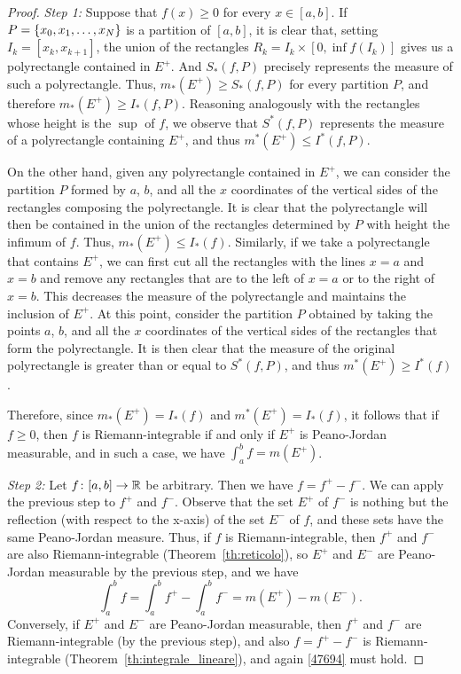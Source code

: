 \begin{proof}
\emph{Step 1:} Suppose that $f(x)\ge 0$ for every $x\in [a,b]$. If $P={\left\{ x_0,x_1, \dots, x_N \right\}}$ is a partition of $[a,b]$, it is clear that, setting $I_k = [x_k,x_{k+1}]$, the union of the rectangles $R_k = I_k \times [0,\inf f(I_k)]$ gives us a polyrectangle contained in $E^+$. And $S_*(f,P)$ precisely represents the measure of such a polyrectangle. Thus, $m_*(E^+)\ge S_*(f,P)$ for every partition $P$, and therefore $m_*(E^+)\ge I_*(f,P)$. Reasoning analogously with the rectangles whose height is the $\sup$ of $f$, we observe that $S^*(f,P)$ represents the measure of a polyrectangle containing $E^+$, and thus $m^*(E^+)\le I^*(f,P)$.

On the other hand, given any polyrectangle contained in $E^+$, we can consider
the partition $P$ formed by $a$, $b$, and all the $x$ coordinates of the
vertical sides of the rectangles composing the polyrectangle. It is clear that
the polyrectangle will then be contained in the union of the rectangles
determined by $P$ with height the infimum of $f$. Thus, $m_*(E^+)\le I_*(f)$.
Similarly, if we take a polyrectangle that contains $E^+$, we can first cut all
the rectangles with the lines $x=a$ and $x=b$ and remove any rectangles that are
to the left of $x=a$ or to the right of $x=b$. This decreases the measure of the
polyrectangle and maintains the inclusion of $E^+$. At this point, consider the
partition $P$ obtained by taking the points $a$, $b$, and all the $x$
coordinates of the vertical sides of the rectangles that form the polyrectangle.
It is then clear that the measure of the original polyrectangle is greater than
or equal to $S^*(f,P)$, and thus $m^*(E^+)\ge I^*(f)$.

Therefore, since $m_*(E^+)=I_*(f)$ and $m^*(E^+)=I_*(f)$, it follows that if
$f\ge0$, then $f$ is Riemann-integrable if and only if $E^+$ is Peano-Jordan
measurable, and in such a case, we have $\int_a^b f = m(E^+)$.

\emph{Step 2:} Let $f\colon[a,b]\to {\mathbb R}$ be arbitrary. Then we have $f = f^+ - f^-$. We can apply the previous step to $f^+$ and $f^-$. Observe that the set $E^+$ of $f^-$ is nothing but the reflection (with respect to the x-axis) of the set $E^-$ of $f$, and these sets have the same Peano-Jordan measure. Thus, if $f$ is Riemann-integrable, then $f^+$ and $f^-$ are also Riemann-integrable (Theorem~\ref{th:reticolo}), so $E^+$ and $E^-$ are Peano-Jordan measurable by the previous step, and we have 
\begin{equation}
  \label{47694}
\int_a^b f = \int_a^b f^+ - \int_a^b f^- = m(E^+) - m(E^-).  
\end{equation}
Conversely, if $E^+$ and $E^-$ are Peano-Jordan measurable, then $f^+$ and $f^-$
are Riemann-integrable (by the previous step), and also $f=f^+-f^-$ is
Riemann-integrable (Theorem~\ref{th:integrale_lineare}), and again \eqref{47694}
must hold.
\end{proof}

